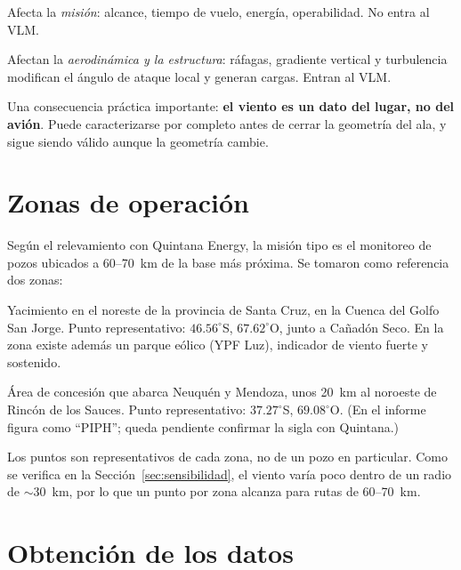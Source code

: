 \documentclass[11pt]{article}
\begin{document}
\begin{description}[leftmargin=3.2cm, style=nextline]
  \item[Viento medio] Afecta la \emph{misión}: alcance, tiempo de vuelo,
  energía, operabilidad. No entra al VLM.
  \item[Variaciones del viento] Afectan la \emph{aerodinámica y la
  estructura}: ráfagas, gradiente vertical y turbulencia modifican el ángulo
  de ataque local y generan cargas. Entran al VLM.
\end{description}

Una consecuencia práctica importante: \textbf{el viento es un dato del lugar,
no del avión}. Puede caracterizarse por completo antes de cerrar la geometría
del ala, y sigue siendo válido aunque la geometría cambie.

\section{Zonas de operación}
\label{sec:zonas}

Según el relevamiento con Quintana Energy, la misión tipo es el monitoreo de
pozos ubicados a 60--70~km de la base más próxima. Se tomaron como
referencia dos zonas:

\begin{description}[leftmargin=3.6cm, style=nextline]
  \item[Cañadón León] Yacimiento en el noreste de la provincia de Santa Cruz,
  en la Cuenca del Golfo San Jorge. Punto representativo: $46.56^\circ$S,
  $67.62^\circ$O, junto a Cañadón Seco. En la zona existe además un parque
  eólico (YPF Luz), indicador de viento fuerte y sostenido.
  \item[Puesto Hernández] Área de concesión que abarca Neuquén y Mendoza,
  unos 20~km al noroeste de Rincón de los Sauces. Punto representativo:
  $37.27^\circ$S, $69.08^\circ$O. (En el informe figura como ``PIPH''; queda
  pendiente confirmar la sigla con Quintana.)
\end{description}

Los puntos son representativos de cada zona, no de un pozo en particular.
Como se verifica en la Sección~\ref{sec:sensibilidad}, el viento varía poco
dentro de un radio de $\sim$30~km, por lo que un punto por zona alcanza para
rutas de 60--70~km.

\section{Obtención de los datos}
\label{sec:obtencion}
\end{document}
